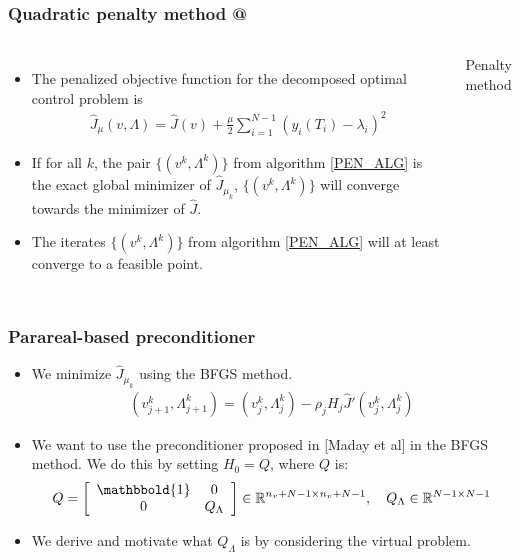 \documentclass[9pt]{beamer}
\makeatletter
\newcommand*{\rom}[1]{\expandafter\@slowromancap\romannumeral #1@}
\makeatother
\begin{document}
\begin{frame}
\frametitle{Quadratic penalty method \rom{2}}
\begin{columns}
\begin{itemize}
\item{The penalized objective function for the decomposed optimal control problem is {\tiny
\begin{align*}
\hat{J}_{\mu}(v,\Lambda) = \hat{J}(v) + \frac{\mu}{2}\sum_{i=1}^{N-1}(y_{i}(T_i)-\lambda_i)^2
\end{align*}}}
\item{If for all $k$, the pair $\{(v^k,\Lambda^k)\}$ from algorithm \ref{PEN_ALG} is the exact global minimizer of $\hat J_{\mu_k}$, $\{(v^k,\Lambda^k)\}$ will converge towards the minimizer of $\hat J$.}
\item{The iterates $\{(v^k,\Lambda^k)\}$ from algorithm \ref{PEN_ALG} will at least converge to a feasible point.}
\end{itemize}
{\tiny
\begin{algorithm}[H] 
\caption{Penalty method\label{PEN_ALG}}
\end{algorithm}}%
\end{columns}
\end{frame}
\begin{frame}
\frametitle{Parareal-based preconditioner}
\begin{itemize}
\item{We minimize $\hat J_{\mu_k}$ using the BFGS method. {\small
\begin{align*}
(v_{j+1}^{k},\Lambda_{j+1}^{k}) = (v_j^k,\Lambda_j^k) - \rho_jH_j \hat J'(v_j^k,\Lambda_j^k)
\end{align*}}}
\item{We want to use the preconditioner proposed in [Maday et al] in the BFGS method. We do this by setting $H_0=Q$, where $Q$ is: {\small
\begin{align*}
Q = \left[ \begin{array}{cc}
	\mathbbold{1} & 0 \\
	0 & Q_{\Lambda} \\
	\end{array} \right]\in \mathbb{R}^{n_v+N-1\times n_v+N-1},\quad Q_{\Lambda}\in\mathbb{R}^{N-1\times N-1}
\end{align*}}}
\item{We derive and motivate what $Q_{\Lambda}$ is by considering the virtual problem.}
\end{itemize}
\end{frame}
\end{document}

